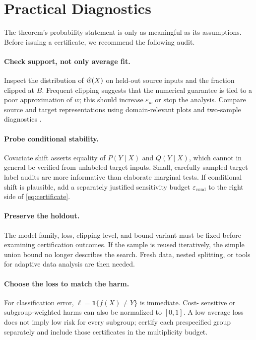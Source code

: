 \section{Practical Diagnostics}
\label{sec:diagnostics}

The theorem's probability statement is only as meaningful as its assumptions.
Before issuing a certificate, we recommend the following audit.

\paragraph{Check support, not only average fit.}
Inspect the distribution of $\widehat w(X)$ on held-out source inputs and the fraction
clipped at $B$.  Frequent clipping suggests that the numerical guarantee is tied to
a poor approximation of $w$; this should increase $\varepsilon_w$ or stop the
analysis.  Compare source and target representations using domain-relevant plots
and two-sample diagnostics \citep{gretton2012kernel}.

\paragraph{Probe conditional stability.}
Covariate shift asserts equality of $P(Y\mid X)$ and $Q(Y\mid X)$, which cannot in
general be verified from unlabeled target inputs.  Small, carefully sampled target
label audits are more informative than elaborate marginal tests.  If conditional
shift is plausible, add a separately justified sensitivity budget
$\varepsilon_{\mathrm{cond}}$ to the right side of \cref{eq:certificate}.

\paragraph{Preserve the holdout.}
The model family, loss, clipping level, and bound variant must be fixed before
examining certification outcomes.  If the sample is reused iteratively, the simple
union bound no longer describes the search.  Fresh data, nested splitting, or tools
for adaptive data analysis are then needed.

\paragraph{Choose the loss to match the harm.}
For classification error, $\ell=\mathbf{1}\{f(X)\neq Y\}$ is immediate.  Cost-
sensitive or subgroup-weighted harms can also be normalized to $[0,1]$.  A low
average loss does not imply low risk for every subgroup; certify each prespecified
group separately and include those certificates in the multiplicity budget.
